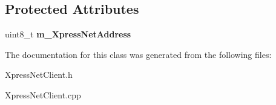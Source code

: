 \subsection*{Protected Attributes}
\begin{DoxyCompactItemize}
\item 
\mbox{\label{classTBT_1_1XpressNetClient_a9af9cd4bed2191d7504b8ae480182643}} 
uint8\+\_\+t {\bfseries m\+\_\+\+Xpress\+Net\+Address}
\end{DoxyCompactItemize}


The documentation for this class was generated from the following files\+:\begin{DoxyCompactItemize}
\item 
Xpress\+Net\+Client.\+h\item 
Xpress\+Net\+Client.\+cpp\end{DoxyCompactItemize}
